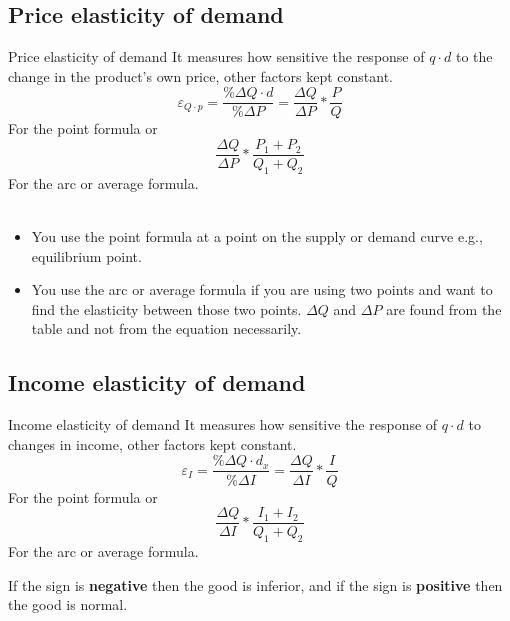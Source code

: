\documentclass[../ECON-281-Notes.tex]{subfiles}
\begin{document}
\subsection{Price elasticity of demand}
\begin{DndSidebar}[color=PhbLightGreen]{Price elasticity of demand}
  It measures how sensitive the response of $q\cdot d$ to the change in the product's own price, other factors kept constant.
  \[ 
    \varepsilon_{Q\cdot p} = \frac{\% \Delta Q\cdot  d}{\% \Delta P} = \frac{\Delta Q}{\Delta P} * \frac{P}{Q}        
  \] 
  For the point formula or
  \[ 
    \frac{\Delta Q}{\Delta P} * \frac{P_1 + P_2}{Q_1 + Q_2} 
  \] 
  For the arc or average formula.  
  \\~\\
  \begin{itemize}
    \item You use the point formula at a point on the supply or demand curve e.g., equilibrium point.
    \item You use the arc or average formula if you are using two points and want to find the elasticity between those two points. $\Delta Q$ and $\Delta P$ are found from the table and not from the equation necessarily.
  \end{itemize}
  
\end{DndSidebar}

\subsection{Income elasticity of demand }
\begin{DndSidebar}[color=PhbLightGreen]{Income elasticity of demand}
  It measures how sensitive the response of $q\cdot d$ to changes in income, other factors kept constant.
  \[ 
  \varepsilon_{I} = \frac{\% \Delta Q\cdot d_x}{\% \Delta I} = \frac{\Delta Q}{\Delta I} * \frac{I}{Q} 
  \] 
  For the point formula or
  \[ 
  \frac{\Delta Q}{\Delta I} * \frac{I_1+I_2}{Q_1+Q_2} 
  \] 
  For the arc or average formula. 

  If the sign is \textbf{negative} then the good is inferior, and if the sign is \textbf{positive} then the good is normal.
\end{DndSidebar}
\end{document}
